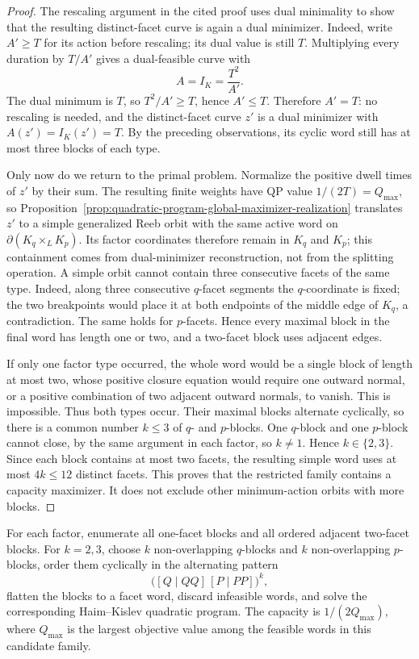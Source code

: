 \begin{proof}
The rescaling argument in the cited proof uses dual minimality to show that the
resulting distinct-facet curve is again a dual minimizer. Indeed, write
\(A'\geq T\) for its action before rescaling; its dual value is still \(T\).
Multiplying every duration by \(T/A'\) gives a dual-feasible curve with
\[
  A=I_K=\frac{T^2}{A'}.
\]
The dual minimum is \(T\), so \(T^2/A'\geq T\), hence \(A'\leq T\). Therefore
\(A'=T\): no rescaling is needed, and the distinct-facet curve \(z'\) is a
dual minimizer with \(A(z')=I_K(z')=T\). By the preceding observations, its
cyclic word still has at most three blocks of each type.

Only now do we return to the primal problem.  Normalize the positive dwell
times of \(z'\) by their sum. The resulting finite weights have QP value
\(1/(2T)=Q_{\max}\), so
Proposition~\ref{prop:quadratic-program-global-maximizer-realization} translates
\(z'\) to a simple generalized Reeb orbit with the same active word on
\(\partial(K_q\times_L K_p)\).  Its factor coordinates therefore remain in
\(K_q\) and \(K_p\); this containment comes from dual-minimizer reconstruction,
not from the splitting operation. A simple orbit cannot contain three
consecutive facets of the same type. Indeed, along
three consecutive \(q\)-facet segments the \(q\)-coordinate is fixed; the two
breakpoints would place it at both endpoints of the middle edge of \(K_q\), a
contradiction. The same holds for \(p\)-facets. Hence every maximal block in
the final word has length one or two, and a two-facet block uses adjacent
edges.

If only one factor type occurred, the whole word would be a single block of
length at most two, whose positive closure equation would require one outward
normal, or a positive combination of two adjacent outward normals, to vanish.
This is impossible. Thus both types occur. Their maximal blocks alternate
cyclically, so there is a common number \(k\leq3\) of \(q\)- and \(p\)-blocks.
One \(q\)-block and one \(p\)-block cannot close, by the same argument in each
factor, so \(k\neq1\). Hence \(k\in\{2,3\}\). Since each block contains at most
two facets, the resulting simple word uses at most \(4k\leq12\) distinct
facets. This proves that the restricted family contains a capacity maximizer.
It does not exclude other minimum-action orbits with more blocks.
\end{proof}

\begin{algorithm}
\label{alg:lagrangian-product-capacity-enumeration}
For each factor, enumerate all one-facet blocks and all ordered adjacent
two-facet blocks. For \(k=2,3\), choose \(k\) non-overlapping \(q\)-blocks and
\(k\) non-overlapping \(p\)-blocks, order them cyclically in the alternating
pattern
\[
  \bigl([Q\mid QQ]\,[P\mid PP]\bigr)^k,
\]
flatten the blocks to a facet word, discard infeasible words, and solve the
corresponding Haim--Kislev quadratic program. The capacity is
\(1/(2Q_{\max})\), where \(Q_{\max}\) is the largest objective value among the
feasible words in this candidate family.
\end{algorithm}

